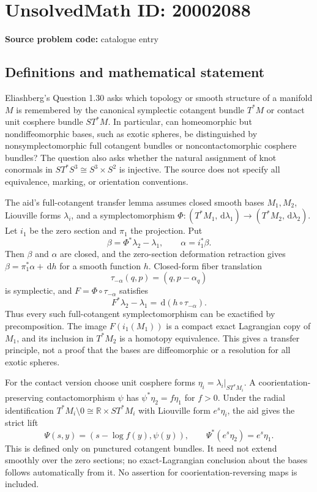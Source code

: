 \documentclass[11pt]{article}
\newcommand{\R}{\mathbb{R}}
\newcommand{\dd}{\,\mathrm{d}}
\begin{document}
\section*{UnsolvedMath ID: 20002088}
\textbf{Source problem code:} catalogue entry
\subsection{Definitions and mathematical statement}
Eliashberg's Question 1.30 asks which topology or smooth structure of a manifold \(M\) is remembered by the canonical symplectic cotangent bundle \(T^*M\) or contact unit cosphere bundle \(ST^*M\). In particular, can homeomorphic but nondiffeomorphic bases, such as exotic spheres, be distinguished by nonsymplectomorphic full cotangent bundles or noncontactomorphic cosphere bundles? The question also asks whether the natural assignment of knot conormals in \(ST^*S^3\cong S^3\times S^2\) is injective. The source does not specify all equivalence, marking, or orientation conventions.

The aid's full-cotangent transfer lemma assumes closed smooth bases \(M_1,M_2\), Liouville forms \(\lambda_i\), and a symplectomorphism
\(\Phi:(T^*M_1,\dd\lambda_1)\to(T^*M_2,\dd\lambda_2)\).
Let \(i_1\) be the zero section and \(\pi_1\) the projection. Put
\[
 \beta=\Phi^*\lambda_2-\lambda_1,\qquad \alpha=i_1^*\beta.
\]
Then \(\beta\) and \(\alpha\) are closed, and the zero-section deformation retraction gives \(\beta=\pi_1^*\alpha+\dd h\) for a smooth function \(h\). Closed-form fiber translation
\[
 \tau_{-\alpha}(q,p)=(q,p-\alpha_q)
\]
is symplectic, and \(F=\Phi\circ\tau_{-\alpha}\) satisfies
\[
 F^*\lambda_2-\lambda_1=\dd(h\circ\tau_{-\alpha}).
\]
Thus every such full-cotangent symplectomorphism can be exactified by precomposition. The image \(F(i_1(M_1))\) is a compact exact Lagrangian copy of \(M_1\), and its inclusion in \(T^*M_2\) is a homotopy equivalence. This gives a transfer principle, not a proof that the bases are diffeomorphic or a resolution for all exotic spheres.

For the contact version choose unit cosphere forms \(\eta_i=\lambda_i|_{ST^*M_i}\). A coorientation-preserving contactomorphism \(\psi\) has
\(\psi^*\eta_2=f\eta_1\) for \(f>0\). Under the radial identification
\(T^*M_i\setminus0\cong\R\times ST^*M_i\) with Liouville form \(e^s\eta_i\), the aid gives the strict lift
\[
 \Psi(s,y)=(s-\log f(y),\psi(y)),\qquad
 \Psi^*(e^s\eta_2)=e^s\eta_1.
\]
This is defined only on punctured cotangent bundles. It need not extend smoothly over the zero sections; no exact-Lagrangian conclusion about the bases follows automatically from it. No assertion for coorientation-reversing maps is included.
\end{document}

